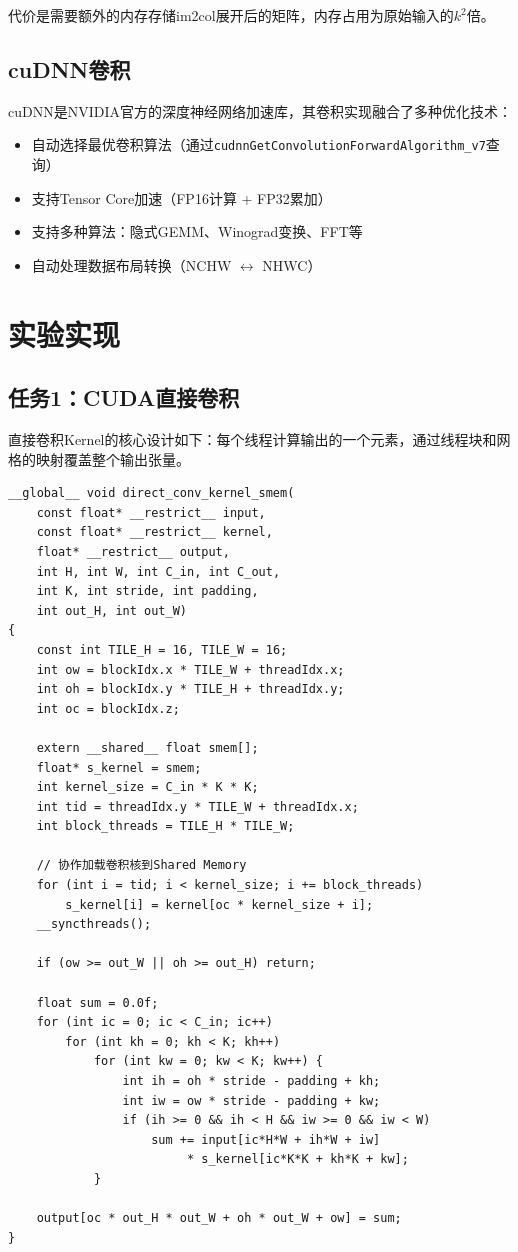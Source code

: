 \documentclass[a4paper]{article}
\begin{document}
代价是需要额外的内存存储im2col展开后的矩阵，内存占用为原始输入的$k^2$倍。

\subsection{cuDNN卷积}

cuDNN是NVIDIA官方的深度神经网络加速库\cite{nvidia_cudnn_developer_guide}，其卷积实现融合了多种优化技术：
\begin{itemize}
    \item 自动选择最优卷积算法（通过\texttt{cudnnGetConvolutionForwardAlgorithm\_v7}查询）\cite{nvidia_cudnn_api_ref}
    \item 支持Tensor Core加速（FP16计算 + FP32累加）
    \item 支持多种算法：隐式GEMM、Winograd变换\cite{lavin2016fast}、FFT等
    \item 自动处理数据布局转换（NCHW $\leftrightarrow$ NHWC）
\end{itemize}

\section{实验实现}

\subsection{任务1：CUDA直接卷积}

直接卷积Kernel的核心设计如下：每个线程计算输出的一个元素，通过线程块和网格的映射覆盖整个输出张量。

\begin{lstlisting}[caption={直接卷积Kernel（Shared Memory优化版）}]
__global__ void direct_conv_kernel_smem(
    const float* __restrict__ input,
    const float* __restrict__ kernel,
    float* __restrict__ output,
    int H, int W, int C_in, int C_out,
    int K, int stride, int padding,
    int out_H, int out_W)
{
    const int TILE_H = 16, TILE_W = 16;
    int ow = blockIdx.x * TILE_W + threadIdx.x;
    int oh = blockIdx.y * TILE_H + threadIdx.y;
    int oc = blockIdx.z;

    extern __shared__ float smem[];
    float* s_kernel = smem;
    int kernel_size = C_in * K * K;
    int tid = threadIdx.y * TILE_W + threadIdx.x;
    int block_threads = TILE_H * TILE_W;

    // 协作加载卷积核到Shared Memory
    for (int i = tid; i < kernel_size; i += block_threads)
        s_kernel[i] = kernel[oc * kernel_size + i];
    __syncthreads();

    if (ow >= out_W || oh >= out_H) return;

    float sum = 0.0f;
    for (int ic = 0; ic < C_in; ic++)
        for (int kh = 0; kh < K; kh++)
            for (int kw = 0; kw < K; kw++) {
                int ih = oh * stride - padding + kh;
                int iw = ow * stride - padding + kw;
                if (ih >= 0 && ih < H && iw >= 0 && iw < W)
                    sum += input[ic*H*W + ih*W + iw]
                         * s_kernel[ic*K*K + kh*K + kw];
            }

    output[oc * out_H * out_W + oh * out_W + ow] = sum;
}
\end{lstlisting}
\end{document}
